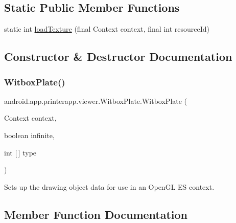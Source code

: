 \subsection*{Static Public Member Functions}
\begin{DoxyCompactItemize}
\item 
static int \hyperlink{classandroid_1_1app_1_1printerapp_1_1viewer_1_1_witbox_plate_ac619cdd0bfed8bcbd3e582fab04b414d}{load\+Texture} (final Context context, final int resource\+Id)
\end{DoxyCompactItemize}


\subsection{Constructor \& Destructor Documentation}
\mbox{\label{classandroid_1_1app_1_1printerapp_1_1viewer_1_1_witbox_plate_a71f02c1c730bc0433e768e4d5475c497}} 
\subsubsection{\texorpdfstring{Witbox\+Plate()}{WitboxPlate()}}
{\footnotesize\ttfamily android.\+app.\+printerapp.\+viewer.\+Witbox\+Plate.\+Witbox\+Plate (\begin{DoxyParamCaption}\item[{Context}]{context,  }\item[{boolean}]{infinite,  }\item[{int \mbox{[}$\,$\mbox{]}}]{type }\end{DoxyParamCaption})}

Sets up the drawing object data for use in an Open\+GL ES context. 

\subsection{Member Function Documentation}
\mbox{\label{classandroid_1_1app_1_1printerapp_1_1viewer_1_1_witbox_plate_a0e15801e297797fb07e3f3f660e23aa3}} 
